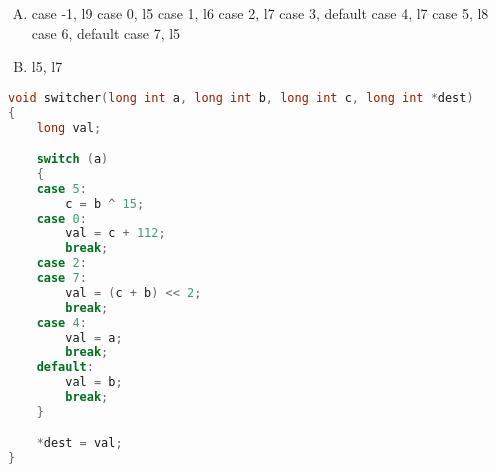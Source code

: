 {{        %
        \begin{practicec}
            \begin{enumerate}[A.]
                \item
                {
                    case -1, l9
                    case 0, l5
                    case 1, l6
                    case 2, l7
                    case 3, default
                    case 4, l7
                    case 5, l8
                    case 6, default
                    case 7, l5
                }
                \item
                {
                    l5, l7
                }
            \end{enumerate}
        \end{practicec}

        \begin{practicec}
            \begin{lstlisting}[language=C]
void switcher(long int a, long int b, long int c, long int *dest)
{
    long val;

    switch (a)
    {
    case 5:
        c = b ^ 15;
    case 0:
        val = c + 112;
        break;
    case 2:
    case 7:
        val = (c + b) << 2;
        break;
    case 4:
        val = a;
        break;
    default:
        val = b;
        break;
    }

    *dest = val;
}
            \end{lstlisting}
        \end{practicec}
    }
}
